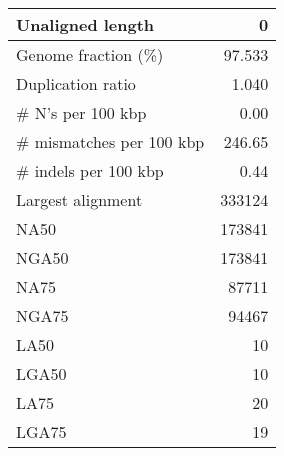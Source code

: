 \documentclass[12pt,a4paper]{article}
\begin{document}
\begin{table}[ht]
\begin{center}
\begin{tabular}{|l*{1}{|r}|}
Unaligned length & 0 \\ \hline
Genome fraction (\%) & 97.533 \\ \hline
Duplication ratio & 1.040 \\ \hline
\# N's per 100 kbp & 0.00 \\ \hline
\# mismatches per 100 kbp & 246.65 \\ \hline
\# indels per 100 kbp & 0.44 \\ \hline
Largest alignment & 333124 \\ \hline
NA50 & 173841 \\ \hline
NGA50 & 173841 \\ \hline
NA75 & 87711 \\ \hline
NGA75 & 94467 \\ \hline
LA50 & 10 \\ \hline
LGA50 & 10 \\ \hline
LA75 & 20 \\ \hline
LGA75 & 19 \\ \hline
\end{tabular}
\end{center}
\end{table}
\end{document}
